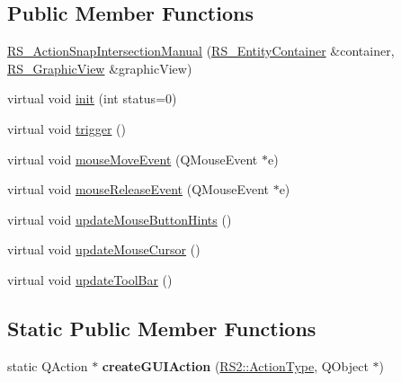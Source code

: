\subsection*{Public Member Functions}
\begin{DoxyCompactItemize}
\item 
\hyperlink{classRS__ActionSnapIntersectionManual_a55eb6a63cf78c25a52160009427b064b}{R\-S\-\_\-\-Action\-Snap\-Intersection\-Manual} (\hyperlink{classRS__EntityContainer}{R\-S\-\_\-\-Entity\-Container} \&container, \hyperlink{classRS__GraphicView}{R\-S\-\_\-\-Graphic\-View} \&graphic\-View)
\item 
virtual void \hyperlink{classRS__ActionSnapIntersectionManual_a86dc49ce963c68283e87cba9b4dff51e}{init} (int status=0)
\item 
virtual void \hyperlink{classRS__ActionSnapIntersectionManual_a207be94887919e22ef4a9aaaeed08b53}{trigger} ()
\item 
virtual void \hyperlink{classRS__ActionSnapIntersectionManual_a32eabccc2241d429b152bcce464ccd70}{mouse\-Move\-Event} (Q\-Mouse\-Event $\ast$e)
\item 
virtual void \hyperlink{classRS__ActionSnapIntersectionManual_a73c8cf8a1368355c3e361a989cafe557}{mouse\-Release\-Event} (Q\-Mouse\-Event $\ast$e)
\item 
virtual void \hyperlink{classRS__ActionSnapIntersectionManual_a86dd76deeb0a9de75097519a4f3ec1a7}{update\-Mouse\-Button\-Hints} ()
\item 
virtual void \hyperlink{classRS__ActionSnapIntersectionManual_a3db9e0a474cbeec13ee578acd00311f2}{update\-Mouse\-Cursor} ()
\item 
virtual void \hyperlink{classRS__ActionSnapIntersectionManual_a29df5d4faacde8a96e2de58b65f872e3}{update\-Tool\-Bar} ()
\end{DoxyCompactItemize}
\subsection*{Static Public Member Functions}
\begin{DoxyCompactItemize}
\item 
\hypertarget{classRS__ActionSnapIntersectionManual_a519e47478ae07cc2f4286edca5b79159}{static Q\-Action $\ast$ {\bfseries create\-G\-U\-I\-Action} (\hyperlink{classRS2_afe3523e0bc41fd637b892321cfc4b9d7}{R\-S2\-::\-Action\-Type}, Q\-Object $\ast$)}\label{classRS__ActionSnapIntersectionManual_a519e47478ae07cc2f4286edca5b79159}

\end{DoxyCompactItemize}

